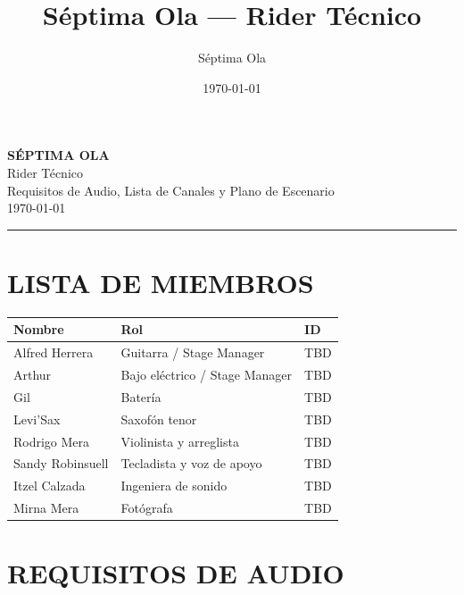 \documentclass[a4paper,12pt]{article}
\title{Séptima Ola --- Rider Técnico}
\author{Séptima Ola}
\date{\today}
\newcommand{\sect}[1]{\section*{\normalfont\Large\bfseries\MakeUppercase{#1}}}
\begin{document}
\begin{center}
    {\LARGE\bfseries SÉPTIMA OLA}\\[0.4em]
    {\Large Rider Técnico}\\[0.3em]
    {\small Requisitos de Audio, Lista de Canales y Plano de Escenario}\\[0.6em]
    {\small \today}
\end{center}

\vspace{1em}
\hrule
\vspace{1em}

\sect{Lista de Miembros}

\begin{center}
    \renewcommand{\arraystretch}{1.4}
    \begin{tabularx}{\textwidth}{@{} l X l @{}}
        \toprule
        \textbf{Nombre} & \textbf{Rol} & \textbf{ID} \\
        \midrule
        Alfred Herrera & Guitarra / Stage Manager & TBD \\
        Arthur & Bajo eléctrico / Stage Manager & TBD \\
        Gil & Batería & TBD \\
        Levi'Sax & Saxofón tenor & TBD \\
        Rodrigo Mera & Violinista y arreglista & TBD \\
        Sandy Robinsuell & Tecladista y voz de apoyo & TBD \\
        Itzel Calzada & Ingeniera de sonido & TBD \\
        Mirna Mera & Fotógrafa & TBD \\
        \bottomrule
    \end{tabularx}
\end{center}

\sect{Requisitos de Audio}
\end{document}
